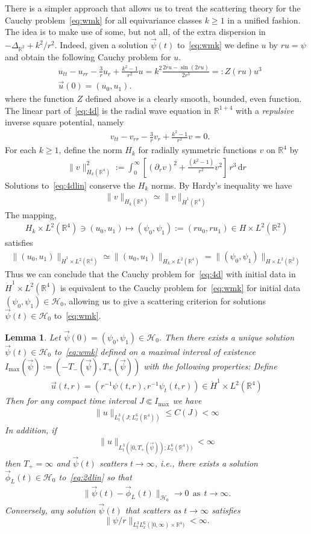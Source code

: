 \documentclass[10pt,reqno]{amsart}
\newcommand{\E}{\mathcal{E}}
\newcommand{\HH}{\mathcal{H}}
\newcommand{\R}{\mathbb{R}}
\newcommand{\De}{\Delta}
\newcommand{\p}{\partial}
\newcommand{\EQ}[1]{\begin{equation}\begin{split} #1 \end{split}\end{equation}}
\numberwithin{equation}{section}
\newtheorem{lem}[thm]{Lemma}
\theoremstyle{remark}
\newcommand{\mas}{{\ \ \text{as} \ \ }}
\newcommand{\ud}{\mathrm{d}}
\newcommand{\0}{\emptyset}
\begin{document}
There is a simpler approach that allows us to treat the scattering theory for the Cauchy problem~\eqref{eq:wmk} for all equivariance classes $k \ge 1$ in a unified fashion.
The idea is to make use of some, but not all, of the extra dispersion in $-\De_{\R^2} + k^2/r^2$.
Indeed, given a solution $\vec \psi(t)$ to~\eqref{eq:wmk} we define  $u$ by $ru = \psi$  and obtain the following Cauchy problem for $u$. 
\EQ{\label{eq:4d}
&u_{tt} - u_{rr} -\frac{3}{r} u_r  +\frac{k^2 -1}{r^2}  u  =  k^2\frac{2r u - \sin(2r u)}{2r^3} =: Z(ru) u^3 \\
&\vec u(0)= (u_0, u_1). 
}
where the function $Z$ defined above is a clearly smooth, bounded, even function. The linear part of~\eqref{eq:4d} is the radial wave equation in $\R^{1+4}$ with a \emph{repulsive} inverse square potential,  namely 
\EQ{\label{eq:4dlin}
&v_{tt} - v_{rr} -\frac{3}{r} v_r  + \frac{k^2-1}{r^2}v=0.
}
For each $k\ge 1$, define the norm $H_k$ for radially symmetric functions $v$ on $\R^4$ by 
\EQ{
\| v \|_{H_k(\R^4)}^2:= \int_0^\infty \left[(\p_r v)^2 + \frac{(k^2-1)}{r^2} v^2 \right] \, r^3 \, \ud r
}
Solutions to~\eqref{eq:4dlin} conserve the $H_k$ norms.  By Hardy's inequality we have 
\EQ{ \label{eq:hardy} 
\|v \|_{H_k(\R^4)} \simeq \| v \|_{\dot{H}^1(\R^4)}
} 
The mapping, 
 \EQ{
 H_k \times L^2 (\R^4)  \ni (u_0, u_1) \mapsto  ( \psi_0, \psi_1):= (ru_0, ru_1) \in H \times L^2 (\R^2)
 }
 satisfies 
 \EQ{ \label{eq:2-4}
\|(u_0, u_1) \|_{\dot{H}^1 \times L^2(\R^4)} \simeq  \| (u_0, u_1) \|_{H_k \times L^2 (\R^4)}  = \| (\psi_0, \psi_1) \|_{H \times L^2 (\R^2)}
 }
Thus we can conclude that the Cauchy problem for~\eqref{eq:4d} with initial data in $\dot{H}^1 \times L^2(\R^4)$ is equivalent to the Cauchy problem for~\eqref{eq:wmk} for initial data $(\psi_0, \psi_1) \in \HH_0$, allowing us to give a scattering criterion for solutions $\vec \psi(t) \in \HH_0$ to~\eqref{eq:wmk}. 

\begin{lem}\label{l:scattering} Let $\vec \psi(0) = (\psi_0, \psi_1) \in \HH_0$. Then there exists a unique solution $\vec \psi(t) \in \HH_0$ to~\eqref{eq:wmk} defined on a maximal interval of existence $I_{\max}(\vec \psi) :=(-T_-(\vec \psi), T_+(\vec \psi))$ with the following properties: Define 
\EQ{
\vec u(t, r) = (r^{-1}\psi(t, r), r^{-1} \psi_t(t, r)  )\in \dot{H}^1\times L^2(\R^4)
}
Then for any compact time interval $J \Subset I_{\max}$ we have 
\EQ{
\| u\|_{L^3_t(J; L^6_x(\R^4))} \le C(J)< \infty
} 
In addition, if 
\EQ{
\| u\|_{L^3_t([0, T_+(\vec \psi)); L^6_x(\R^4))} < \infty
}
then $T_+ = \infty$ and $\vec \psi(t)$ scatters $t \to \infty$, i.e., there exists a solution $\vec\phi_L(t) \in \HH_0$ to~\eqref{eq:2dlin} so that 
\EQ{
\| \vec \psi(t) - \vec \phi_L(t) \|_{\HH_0} \to 0 \mas t \to \infty.
}
Conversely, any solution $\vec \psi(t)$ that scatters as $t \to \infty$ satisfies $$\|  \psi/ r\|_{L^3_tL^6_x([0, \infty) \times \R^4)} < \infty.$$ 
\end{lem}
\end{document}
